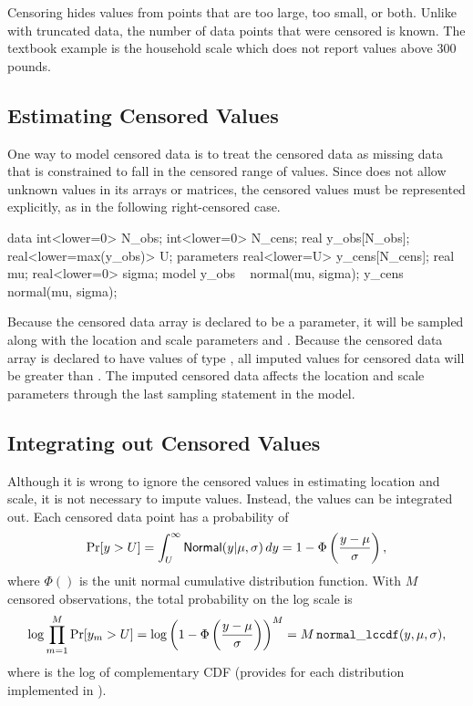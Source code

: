Censoring hides values from points that are too large, too small, or
both.  Unlike with truncated data, the number of data points that were
censored is known.  The textbook example is the household scale which
does not report values above 300 pounds.  

\subsection{Estimating Censored Values}

One way to model censored data is to treat the censored data as
missing data that is constrained to fall in the censored range of
values.  Since \Stan does not allow unknown values in its arrays or
matrices, the censored values must be represented explicitly, as in the
following right-censored case.
%
\begin{stancode}
data {
  int<lower=0> N_obs;
  int<lower=0> N_cens;
  real y_obs[N_obs];
  real<lower=max(y_obs)> U;
}
parameters {
  real<lower=U> y_cens[N_cens];
  real mu;
  real<lower=0> sigma;
}
model {
  y_obs ~ normal(mu, sigma);
  y_cens ~ normal(mu, sigma);
}
\end{stancode}
%
Because the censored data array  is declared to be a parameter, it
will be sampled along with the location and scale parameters 
and .  Because the censored data array  is
declared to have values of type , all imputed values
for censored data will be greater than .  The imputed censored
data affects the location and scale parameters through the last
sampling statement in the model.  

\subsection{Integrating out Censored Values}

Although it is wrong to ignore the censored values in estimating
location and scale, it is not necessary to impute values.  Instead,
the values can be integrated out.  Each censored data point has a
probability of
%
\[
\mbox{Pr}[y > U] 
= \int_U^{\infty} \distro{Normal}(y|\mu,\sigma) \, dy
= 1 - \Phi\left(\frac{y - \mu}{\sigma}\right),
\]
%
where $\Phi()$ is the unit normal cumulative distribution function.
With $M$ censored observations, the total probability on the log scale
is
\[
\log \prod_{m=1}^M \mbox{Pr}[y_m > U]
= \log \left( 1 - \Phi\left(\frac{y - \mu}{\sigma}\right)\right)^{M}
= M \, \code{normal\_lccdf}(y,\mu,\sigma),
\]
%
where  is the log of complementary CDF
(\Stan provides  for each distribution
implemented in \Stan).

